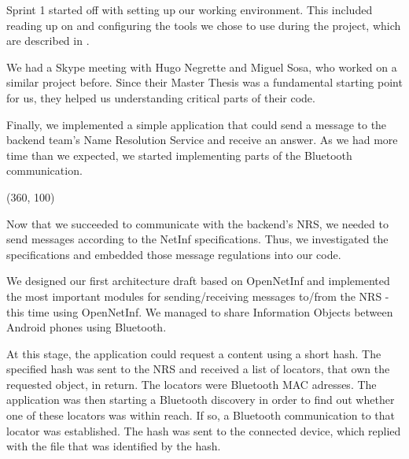 Sprint 1 started off with setting up our working environment.
This included reading up on and configuring the tools we chose to use during the project,
which are described in .

We had a Skype meeting with Hugo Negrette and Miguel Sosa, who worked on a
similar project before. Since their Master Thesis was a fundamental starting point
for us, they helped us understanding critical parts of their code.

Finally, we implemented a simple application that could send a message to
the backend team's Name Resolution Service and receive an answer. As
we had more time than we expected, we started implementing parts of
the Bluetooth communication.


\framebox(360, 100){
}

Now that we succeeded to communicate with the backend's NRS,
we needed to send messages according to the NetInf specifications.
Thus, we investigated the specifications and embedded those message regulations
into our code. 

We designed our first architecture draft based on OpenNetInf and implemented
the most important modules for sending/receiving messages to/from the NRS -
this time using OpenNetInf. We managed to share Information Objects between
Android phones using Bluetooth. 

At this stage, the application could request a content using a short hash.
The specified hash was sent to the NRS and received a list of locators, that own
the requested object, in return. The locators were Bluetooth MAC adresses.
The application was then starting a Bluetooth discovery in order to find out
whether one of these locators was within reach. If so, a Bluetooth communication
to that locator was established. The hash was sent to the connected device, which
replied with the file that was identified by the hash.


